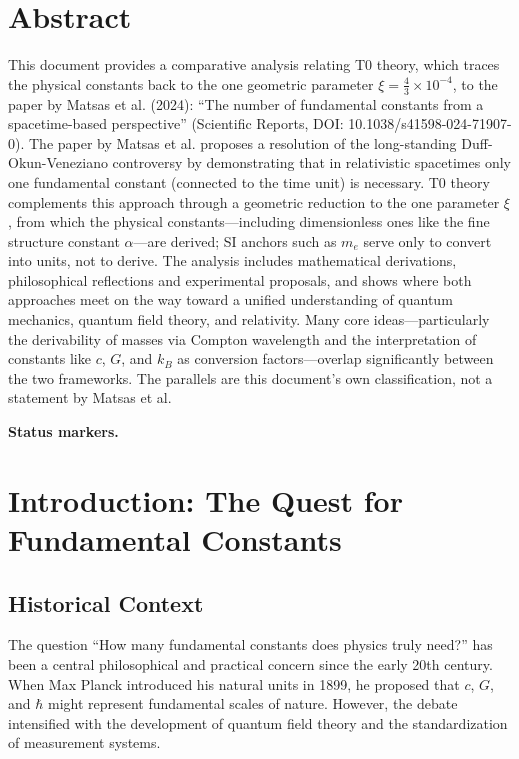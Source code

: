 \section*{Abstract}
		This document provides a comparative analysis relating T0 theory, which traces the physical constants back to the one geometric parameter $\xi = \frac{4}{3} \times 10^{-4}$, to the paper by Matsas et al. (2024): ``The number of fundamental constants from a spacetime-based perspective'' (Scientific Reports, DOI: 10.1038/s41598-024-71907-0). The paper by Matsas et al. proposes a resolution of the long-standing Duff-Okun-Veneziano controversy by demonstrating that in relativistic spacetimes only one fundamental constant (connected to the time unit) is necessary. T0 theory complements this approach through a geometric reduction to the one parameter $\xi$, from which the physical constants—including dimensionless ones like the fine structure constant $\alpha$—are derived; SI anchors such as $m_e$ serve only to convert into units, not to derive. The analysis includes mathematical derivations, philosophical reflections and experimental proposals, and shows where both approaches meet on the way toward a unified understanding of quantum mechanics, quantum field theory, and relativity. Many core ideas—particularly the derivability of masses via Compton wavelength and the interpretation of constants like $c$, $G$, and $k_B$ as conversion factors—overlap significantly between the two frameworks. The parallels are this document's own classification, not a statement by Matsas et al.

\medskip\noindent\textbf{Status markers.}


	
	
	
	
	\section{Introduction: The Quest for Fundamental Constants}
	
	\subsection{Historical Context}
	
	The question ``How many fundamental constants does physics truly need?'' has been a central philosophical and practical concern since the early 20th century. When Max Planck introduced his natural units in 1899, he proposed that $c$, $G$, and $\hbar$ might represent fundamental scales of nature. However, the debate intensified with the development of quantum field theory and the standardization of measurement systems.
	
